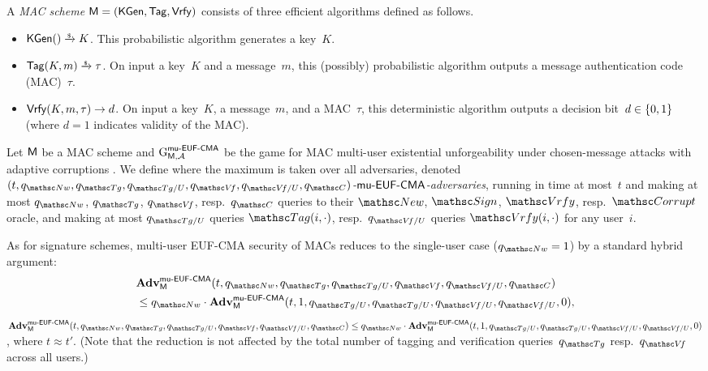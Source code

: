 \fi


\iffull
\begin{definition}
	\label{def:MAC-scheme}
	A \emph{MAC scheme} $\mathsf{M} = (\mathsf{KGen},\allowbreak \mathsf{Tag},\allowbreak \mathsf{Vrfy})$ consists of three efficient algorithms defined as follows.
	\begin{itemize}
		\item $\MACKGen() \tor K$.
			This probabilistic algorithm generates a key~$K$.
		
		\item $\MACTag(K, m) \tor \tau$.
			On input a key~$K$ and a message~$m$, this (possibly) probabilistic algorithm outputs a message authentication code (MAC)~$\tau$.
		
		\item $\mathsf{Vrfy}(K, m, \tau) \to d$.
			On input a key~$K$, a message~$m$, and a MAC~$\tau$, this deterministic algorithm outputs a decision bit~$d \in \{0,1\}$ (where $d = 1$ indicates validity of the MAC).
	\end{itemize}
\end{definition}
\fi


\begin{definition}
	\label{def:MAC-muEUFCMA}
	Let $\mathsf{M}$ be a MAC scheme
	and $\textnormal{G}^{\mathsf{mu{\text{\normalfont-}}EUF{\text{\normalfont-}}CMA}}_{\mathsf{M},\mathcal{A}}$ be the game for MAC multi-user existential unforgeability under chosen-message attacks with adaptive corruptions .
	We define
	where the maximum is taken over all adversaries, denoted \emph{$(t\cab \qNew\cab \qTag\cab\qTagU\cab \qVerify\cab\qVerifyU\cab \qCorrupt)$-\fullonly{\linebreak}$\mathsf{mu{\text{\normalfont-}}EUF{\text{\normalfont-}}CMA}$-adversaries}, running in time at most~$t$ and making at most $\qNew$, $\qTag$, $\qVerify$, resp.\ $\qCorrupt$ queries to their $\New$, $\OSign$, $\OVerify$, resp.\ $\Corrupt$ oracle, and making at most $\qTagU$ queries $\OTag(i, \cdot)$, resp.\ $\qVerifyU$ queries $\OVerify(i, \cdot)$ for any user~$i$.
\end{definition}

As for signature schemes, multi-user EUF-CMA security of MACs reduces to the single-user case ($\qNew = 1$) by a standard hybrid argument:
\iffull
\begin{align*}
	&\Adv^{\muEUFCMA}_{\MACScheme}(t, \qNew, \qTag, \qTagU, \qVerify, \qVerifyU, \qCorrupt) \\
	&\leq \qNew \cdot \Adv^{\muEUFCMA}_{\MACScheme}(t, 1, \qTagU, \qTagU, \qVerifyU, \qVerifyU, 0),
\end{align*}
\else
$\Adv^{\muEUFCMA}_{\MACScheme}(t\cab \qNew\cab \qTag\cab \qTagU\cab \qVerify\cab \qVerifyU\cab \qCorrupt) \leq \qNew \cdot \Adv^{\muEUFCMA}_{\MACScheme}(t\cab 1\cab \qTagU\cab \qTagU\cab \qVerifyU\cab \qVerifyU\cab 0)$,
\fi
where $t \approx t'$.
(Note that the reduction is not affected by the total number of tagging and verification queries~$\qTag$ resp.\ $\qVerify$ across all users.)

